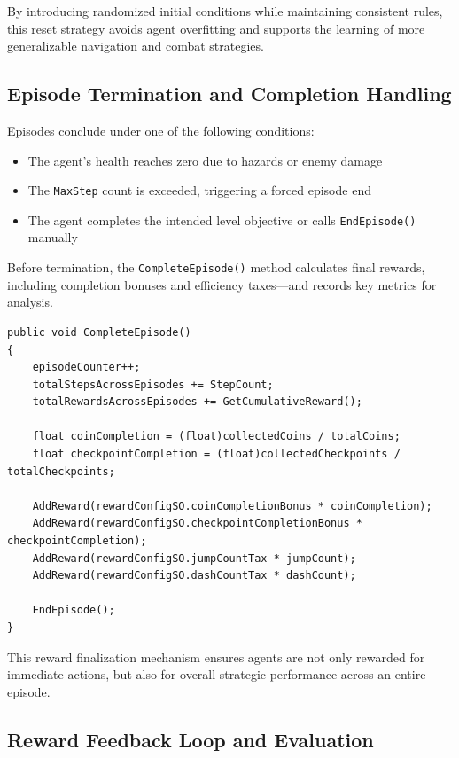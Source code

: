 \documentclass[12pt,oneside,openright,a4paper]{cpe-english-project}
\begin{document}
By introducing randomized initial conditions while maintaining consistent rules, this reset strategy avoids agent overfitting and supports the learning of more generalizable navigation and combat strategies.

\subsection{Episode Termination and Completion Handling}

Episodes conclude under one of the following conditions:

\begin{itemize}
\item The agent’s health reaches zero due to hazards or enemy damage
\item The \texttt{MaxStep} count is exceeded, triggering a forced episode end
\item The agent completes the intended level objective or calls \texttt{EndEpisode()} manually
\end{itemize}

Before termination, the \texttt{CompleteEpisode()} method calculates final rewards, including completion bonuses and efficiency taxes—and records key metrics for analysis.

\begin{lstlisting}[language={[Sharp]C}]
public void CompleteEpisode()
{
	episodeCounter++;
	totalStepsAcrossEpisodes += StepCount;
	totalRewardsAcrossEpisodes += GetCumulativeReward();
	
	float coinCompletion = (float)collectedCoins / totalCoins;
	float checkpointCompletion = (float)collectedCheckpoints / totalCheckpoints;

	AddReward(rewardConfigSO.coinCompletionBonus * coinCompletion);
	AddReward(rewardConfigSO.checkpointCompletionBonus * checkpointCompletion);
	AddReward(rewardConfigSO.jumpCountTax * jumpCount);
	AddReward(rewardConfigSO.dashCountTax * dashCount);

	EndEpisode();
}
\end{lstlisting}

This reward finalization mechanism ensures agents are not only rewarded for immediate actions, but also for overall strategic performance across an entire episode.

\subsection{Reward Feedback Loop and Evaluation}
\end{document}
